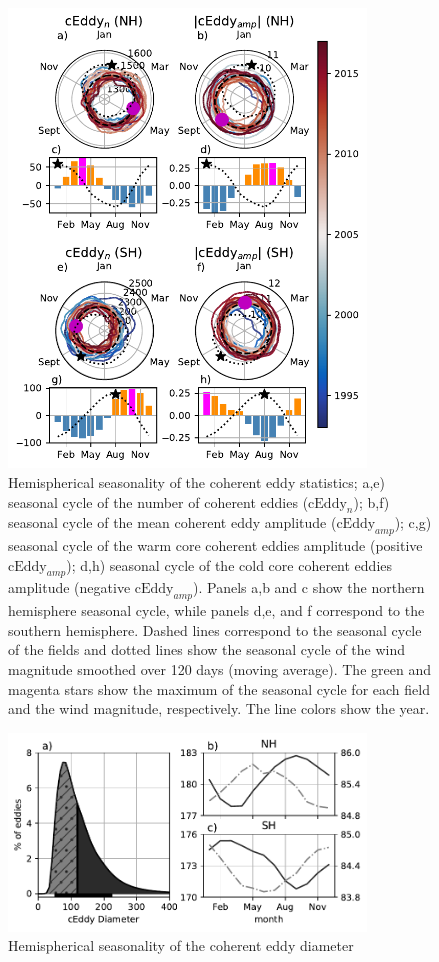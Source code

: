 \documentclass[draft,linenumbers]{agujournal2019}
\newcommand{\cEddy}{\textrm{cEddy}}
\begin{document}
	\begin{figure}
	    \centering
	    \includegraphics[width=95mm]{figures/All_polar_plots_eddy_stats_polarity_V3.pdf}
	    \caption{Hemispherical seasonality of the coherent eddy statistics;
		a,e) seasonal cycle of the number of coherent eddies ($\cEddy_n$); b,f) seasonal cycle of the mean coherent eddy amplitude ($\cEddy_{amp}$); c,g) seasonal cycle of the warm core coherent eddies amplitude (positive $\cEddy_{amp}$); d,h) seasonal cycle of the cold core coherent eddies amplitude (negative $\cEddy_{amp}$). Panels a,b and c show the northern hemisphere seasonal cycle, while panels d,e, and f correspond to the southern hemisphere. Dashed lines correspond to the seasonal cycle of the fields and dotted lines show the seasonal cycle of the wind magnitude smoothed over 120 days (moving average). The green and magenta stars show the maximum of the seasonal cycle for each field and the wind magnitude, respectively. The line colors show the year.}
	    \label{fig:eddy_stats_polar}
	\end{figure}

	\begin{figure}
	    \centering
	    \includegraphics[width=95mm]{figures/eddy_diameter_seasonal.pdf}
	    \caption{Hemispherical seasonality of the coherent eddy diameter}
	    \label{fig:eddy_stats_polar}
	\end{figure}
\end{document}
